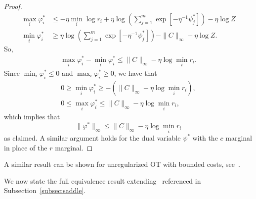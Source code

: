 \documentclass[10pt]{article}
\theoremstyle{plain}
\theoremstyle{definition}
\theoremstyle{remark}
\begin{document}
\begin{proof}
\begin{align*}
        \max_{i}\varphi_i^*&\leq -\eta \min_i\log r_i+\eta \log\left(\sum_{j=1}^m\exp[-\eta ^{-1}\psi^*_j]\right)-\eta \log Z\\
        \min_{i}\varphi_i^*&\geq  \eta \log\left(\sum_{j=1}^m\exp[-\eta ^{-1}\psi^*_j]\right) - \|C\|_\infty - \eta \log Z.
    \end{align*}
    So,
    \begin{align*}
        \max_{i}\varphi_i^*-\min_{i}\varphi_i^*\leq \|C\|_\infty-\eta \log\min_{i} r_i.
    \end{align*}
    Since $\min_{i}\varphi_i^*\leq 0$ and $\max_{i}\varphi_i^*\geq 0$, we have that 
    \begin{align*}
        0\geq\min_{i}\varphi_i^*\geq -(\|C\|_\infty-\eta \log\min_{i} r_i),\\
        0\leq\max_{i}\varphi_i^*\leq \|C\|_\infty-\eta \log\min_{i} r_i,
    \end{align*}
    which implies that 
    \[
    \|\varphi^*\|_\infty \leq \|C\|_\infty-\eta \log\min_{i} r_i
    \]
    as claimed. A similar argument holds for the dual variable $\psi^*$ with the $c$ marginal in place of the $r$ marginal.  
\end{proof}
A similar result can be shown for unregularized OT with bounded costs, see~\cite[Remark 1.13]{villaniTopicsOptimalTransportation2003}.

\vspace{1em}
We now state the full equivalence result extending~\cite[Lemma 2.3]{jambulapatiDirectTildelbraceOrbrace2019a} referenced in Subsection~\ref{subsec:saddle}.
\end{document}
